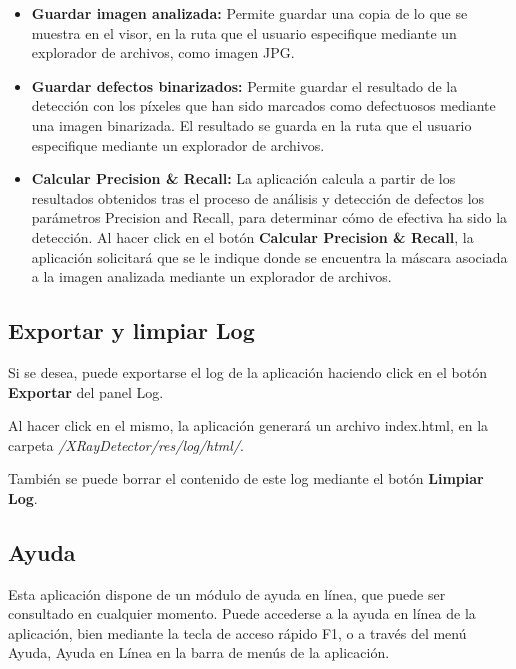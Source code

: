 \begin{itemize}
\item \textbf{Guardar imagen analizada:} Permite guardar una copia de lo que se muestra en el visor, en la ruta que el usuario especifique mediante un explorador de archivos, como imagen JPG.
\item \textbf{Guardar defectos binarizados:} Permite guardar el resultado de la detección con los píxeles que han sido marcados como defectuosos mediante una imagen binarizada. El resultado se guarda en la ruta que el usuario especifique mediante un explorador de archivos.
\item \textbf{Calcular Precision \& Recall:} La aplicación calcula a partir de los resultados obtenidos tras el proceso de análisis y detección de defectos los parámetros Precision and Recall, para determinar cómo de efectiva ha sido la detección. Al hacer click en el botón \textbf{Calcular Precision \& Recall}, la aplicación solicitará que se le indique donde se encuentra la máscara asociada a la imagen analizada mediante un explorador de archivos.
\end{itemize}


\subsection{Exportar y limpiar Log}
Si se desea, puede exportarse el log de la aplicación haciendo click en el botón \textbf{Exportar} del panel Log.


Al hacer click en el mismo, la aplicación generará un archivo index.html, en la carpeta \textit{/XRayDetector/res/log/html/}.

También se puede borrar el contenido de este log mediante el botón \textbf{Limpiar Log}.

\subsection{Ayuda}
Esta aplicación dispone de un módulo de ayuda en línea, que puede ser consultado en cualquier momento. Puede accederse a la ayuda en línea de la aplicación, bien mediante la tecla de acceso rápido F1, o a través del menú Ayuda, Ayuda en Línea en la barra de menús de la aplicación.

